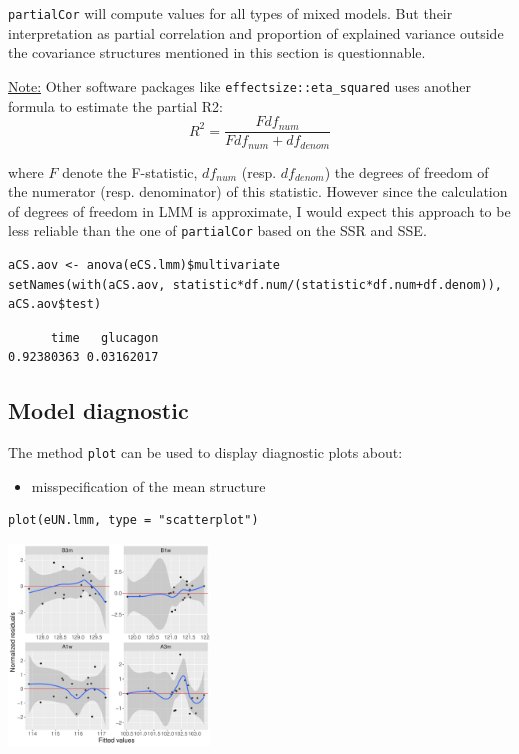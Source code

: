 \documentclass[12pt]{article}
\newcommand\Warning[1][3ex]{%
\renewcommand\stacktype{L}%
\scaleto{\stackon[1.3pt]{\color{red}$\triangle$}{\tiny\bfseries !}}{#1}%
\xspace
}
\begin{document}
\bigskip

\Warning \texttt{partialCor} will compute values for all types of mixed
models. But their interpretation as partial correlation and proportion
of explained variance outside the covariance structures mentioned in
this section is questionnable.

\bigskip

\uline{Note:} Other software packages like \texttt{effectsize::eta\_squared} uses
another formula to estimate the partial R2:
\[ R^2=\frac{F df_{num}}{F df_{num} + df_{denom}} \]

where \(F\) denote the F-statistic, \(df_{num}\)
(resp. \(df_{denom}\)) the degrees of freedom of the numerator
(resp. denominator) of this statistic. However since the calculation
of degrees of freedom in LMM is approximate, I would expect this
approach to be less reliable than the one of \texttt{partialCor} based on the
SSR and SSE.

\lstset{language=r,label= ,caption= ,captionpos=b,numbers=none}
\begin{lstlisting}
aCS.aov <- anova(eCS.lmm)$multivariate
setNames(with(aCS.aov, statistic*df.num/(statistic*df.num+df.denom)), aCS.aov$test)
\end{lstlisting}

\begin{verbatim}
      time   glucagon 
0.92380363 0.03162017
\end{verbatim}



\bigskip


\clearpage

\subsection{Model diagnostic}
\label{sec:orgddd79ce}

The method \texttt{plot} can be used to display diagnostic plots about:
\begin{itemize}
\item misspecification of the mean structure
\end{itemize}
\lstset{language=r,label= ,caption= ,captionpos=b,numbers=none}
\begin{lstlisting}
plot(eUN.lmm, type = "scatterplot")
\end{lstlisting}

\begin{center}
\includegraphics[width=0.4\textwidth]{./figures/diag-scatterplot.pdf}
\end{center}
\end{document}
